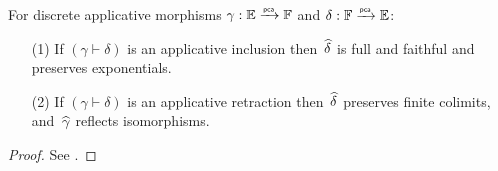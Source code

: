 \begin{proposition}
  \label{th:inclusion_retraction_properties}%
  \textnormal{\cite[Proposition 2.5.11]{Longley:94}} For discrete
  applicative morphisms $\gamma: {\mathbb{E}} \xrightarrow{\scriptscriptstyle\mathsf{pca}}{} {\mathbb{F}}$ and $\delta: {\mathbb{F}}
  \xrightarrow{\scriptscriptstyle\mathsf{pca}}{} {\mathbb{E}}$:
  \begin{enumerate}
  \item[(1)] If $(\gamma \vdash \delta)$ is an applicative inclusion
    then~$\widehat{\delta}$ is full and faithful and preserves
    exponentials.
  \item[(2)] If $(\gamma \vdash \delta)$ is an applicative retraction
    then~$\widehat{\delta}$ preserves finite colimits, and~$\widehat{\gamma}$
    reflects isomorphisms.
  \end{enumerate}
\end{proposition}

\begin{proof}
  See \cite[Proposition 2.5.11]{Longley:94}.
\end{proof}



